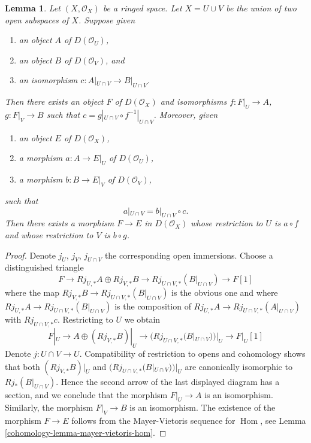 \documentclass{amsart}
\theoremstyle{plain}
\newtheorem{lemma}[subsection]{Lemma}
\theoremstyle{definition}
\theoremstyle{remark}
\numberwithin{equation}{subsection}
\def\Hom{\mathop{\mathrm{Hom}}\nolimits}
\begin{document}
\begin{lemma}
\label{cohomology-lemma-glue}
Let $(X, \mathcal{O}_X)$ be a ringed space. Let $X = U \cup V$ be
the union of two open subspaces of $X$. Suppose given
\begin{enumerate}
\item an object $A$ of $D(\mathcal{O}_U)$,
\item an object $B$ of $D(\mathcal{O}_V)$, and
\item an isomorphism $c : A|_{U \cap V} \to B|_{U \cap V}$.
\end{enumerate}
Then there exists an object $F$ of $D(\mathcal{O}_X)$
and isomorphisms $f : F|_U \to A$, $g : F|_V \to B$ such
that $c = g|_{U \cap V} \circ f^{-1}|_{U \cap V}$.
Moreover, given
\begin{enumerate}
\item an object $E$ of $D(\mathcal{O}_X)$,
\item a morphism $a : A \to E|_U$ of $D(\mathcal{O}_U)$,
\item a morphism $b : B \to E|_V$ of $D(\mathcal{O}_V)$, 
\end{enumerate}
such that
$$
a|_{U \cap V}  = b|_{U \cap V} \circ c.
$$
Then there exists a morphism $F \to E$ in $D(\mathcal{O}_X)$
whose restriction to $U$ is $a \circ f$
and whose restriction to $V$ is $b \circ g$.
\end{lemma}

\begin{proof}
Denote $j_U$, $j_V$, $j_{U \cap V}$ the corresponding open immersions.
Choose a distinguished triangle
$$
F \to Rj_{U, *}A \oplus Rj_{V, *}B \to Rj_{U \cap V, *}(B|_{U \cap V})
\to F[1]
$$
where the map $Rj_{V, *}B \to Rj_{U \cap V, *}(B|_{U \cap V})$ is the
obvious one and where
$Rj_{U, *}A \to Rj_{U \cap V, *}(B|_{U \cap V})$
is the composition of
$Rj_{U, *}A \to Rj_{U \cap V, *}(A|_{U \cap V})$
with $Rj_{U \cap V, *}c$. Restricting to $U$ we obtain
$$
F|_U \to A \oplus (Rj_{V, *}B)|_U \to (Rj_{U \cap V, *}(B|_{U \cap V}))|_U
\to F|_U[1]
$$
Denote $j : U \cap V \to U$. Compatibility of restriction to opens and
cohomology shows that both
$(Rj_{V, *}B)|_U$ and $(Rj_{U \cap V, *}(B|_{U \cap V}))|_U$
are canonically isomorphic to $Rj_*(B|_{U \cap V})$.
Hence the second arrow of the last displayed diagram has
a section, and we conclude that the morphism $F|_U \to A$ is
an isomorphism. Similarly, the morphism $F|_V \to B$ is an
isomorphism. The existence of the morphism $F \to E$ follows
from the Mayer-Vietoris sequence for $\Hom$, see
Lemma \ref{cohomology-lemma-mayer-vietoris-hom}.
\end{proof}
\end{document}
